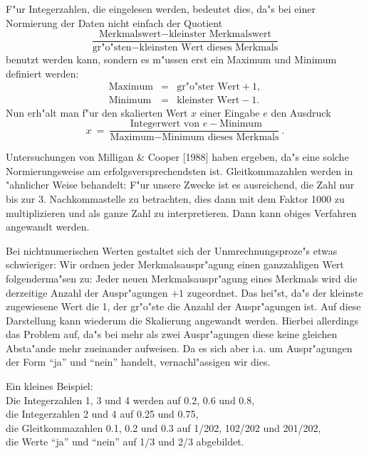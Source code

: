 F"ur Integerzahlen, die eingelesen werden, bedeutet dies, da"s bei einer
Normierung der Daten nicht einfach der Quotient
\[ \frac{\mbox{Merkmalswert} - \mbox{kleinster Merkmalswert}}
	    {\mbox{gr"o"sten} - \mbox{kleinsten Wert dieses Merkmals}} \]
benutzt werden kann, sondern es m"ussen erst ein Maximum und Minimum
definiert werden:
\begin{eqnarray*}
	\mbox{Maximum} & = & \mbox{gr"o"ster Wert} + 1, \\
	\mbox{Minimum} & = & \mbox{kleinster Wert} - 1.
\end{eqnarray*}
Nun erh"alt man f"ur den skalierten Wert $x$ einer Eingabe $e$ den 
Ausdruck
\[ x \ = \ \frac{\mbox{ Integerwert von $e$} - \mbox{Minimum}}
		        {\mbox{Maximum} - \mbox{Minimum dieses Merkmals}}\ . \]

Untersuchungen von Milligan \& Cooper [1988] haben ergeben, da"s eine
solche Normierungsweise am erfolgsversprechendsten ist.
Gleitkommazahlen werden in "ahnlicher Weise behandelt: 
F"ur unsere Zwecke ist es ausreichend, die Zahl nur bis zur 3.
Nachkommastelle zu betrachten, dies dann mit dem Faktor 1000 zu
multiplizieren und als ganze Zahl zu interpretieren.
Dann kann obiges Verfahren angewandt werden.

Bei nichtnumerischen Werten gestaltet sich der Unmrechnungsproze"s 
etwas schwieriger:
Wir ordnen jeder Merkmalsauspr"agung einen ganzzahligen Wert
folgenderma"sen zu:
Jeder neuen Merkmalsauspr"agung eines Merkmals wird die derzeitige
Anzahl der Auspr"agungen $+ 1$ zugeordnet. Das hei"st, da"s der
kleinste zugewiesene Wert die 1, der gr"o"ste die Anzahl der 
Auspr"agungen ist. Auf diese Darstellung 
kann wiederum die Skalierung angewandt werden. Hierbei allerdings
das Problem auf, da"s bei mehr als zwei Auspr"agungen diese 
keine gleichen Absta"ande mehr zueinander aufweisen. Da es sich aber i.a.
um Auspr"agungen der Form "`ja"' und "`nein"' handelt, vernachl"assigen
wir dies.


Ein kleines Beispiel:\\
Die Integerzahlen 1, 3 und 4 werden auf 0.2, 0.6 und 0.8,\\
die Integerzahlen 2 und 4 auf 0.25 und 0.75,\\
die Gleitkommazahlen 0.1, 0.2 und 0.3 auf 1/202, 102/202 und 201/202,\\
die Werte "`ja"' und "`nein"' auf 1/3 und 2/3 abgebildet.

